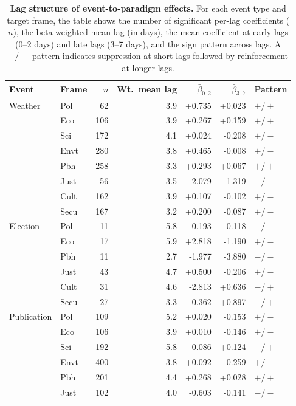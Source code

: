 \begin{table}[h]
\centering
\renewcommand{\arraystretch}{1.15}
\caption{\textbf{Lag structure of event-to-paradigm effects.}
For each event type and target frame, the table shows the number
of significant per-lag coefficients ($n$), the beta-weighted mean
lag (in days), the mean coefficient at early lags (0--2 days)
and late lags (3--7 days), and the sign pattern across lags.
A $-/+$ pattern indicates suppression at short lags followed by
reinforcement at longer lags.}
\label{tab:si_lag_analysis}
\vspace{0.3em}
\footnotesize
\begin{tabular}{@{}l l r r r r l@{}}
\toprule
Event & Frame & $n$ & Wt.\ mean lag & $\bar{\beta}_{0\text{--}2}$
& $\bar{\beta}_{3\text{--}7}$ & Pattern \\
\midrule
Weather & Pol & 62 & 3.9 & +0.735 & +0.023 & $+/+$ \\
 & Eco & 106 & 3.9 & +0.267 & +0.159 & $+/+$ \\
 & Sci & 172 & 4.1 & +0.024 & -0.208 & $+/-$ \\
 & Envt & 280 & 3.8 & +0.465 & -0.008 & $+/-$ \\
 & Pbh & 258 & 3.3 & +0.293 & +0.067 & $+/+$ \\
 & Just & 56 & 3.5 & -2.079 & -1.319 & $-/-$ \\
 & Cult & 162 & 3.9 & +0.107 & -0.102 & $+/-$ \\
 & Secu & 167 & 3.2 & +0.200 & -0.087 & $+/-$ \\
Election & Pol & 11 & 5.8 & -0.193 & -0.118 & $-/-$ \\
 & Eco & 17 & 5.9 & +2.818 & -1.190 & $+/-$ \\
 & Pbh & 11 & 2.7 & -1.977 & -3.880 & $-/-$ \\
 & Just & 43 & 4.7 & +0.500 & -0.206 & $+/-$ \\
 & Cult & 31 & 4.6 & -2.813 & +0.636 & $-/+$ \\
 & Secu & 27 & 3.3 & -0.362 & +0.897 & $-/+$ \\
Publication & Pol & 109 & 5.2 & +0.020 & -0.153 & $+/-$ \\
 & Eco & 106 & 3.9 & +0.010 & -0.146 & $+/-$ \\
 & Sci & 192 & 5.8 & -0.086 & +0.124 & $-/+$ \\
 & Envt & 400 & 3.8 & +0.092 & -0.259 & $+/-$ \\
 & Pbh & 201 & 4.4 & +0.268 & +0.028 & $+/+$ \\
 & Just & 102 & 4.0 & -0.603 & -0.141 & $-/-$ \\

\end{tabular}
\end{table}
